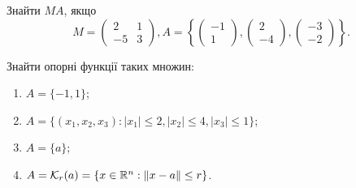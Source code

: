 \begin{problem}
    Знайти $MA$, якщо \[ M = \begin{pmatrix} 2 & 1 \\ -5 & 3 \end{pmatrix}, A = \left\{ \begin{pmatrix} -1 \\ 1 \end{pmatrix}, \begin{pmatrix} 2 \\ -4 \end{pmatrix}, \begin{pmatrix} -3 \\ -2 \end{pmatrix} \right\}. \]
\end{problem}



\begin{problem}
    Знайти опорні функції таких множин:
    \begin{enumerate}
        \item $A = \{ -1, 1 \}$;
        \item $A = \{ (x_1, x_2, x_3) : |x_1| \le 2, |x_2| \le  4, |x_3| \le 1 \}$;
        \item $A = \{ a \}$;
        \item $A = \mathcal{K}_r(a) = \{ x\in \mathbb{R}^n : \| x - a \| \le r \}$.
    \end{enumerate}
\end{problem}

